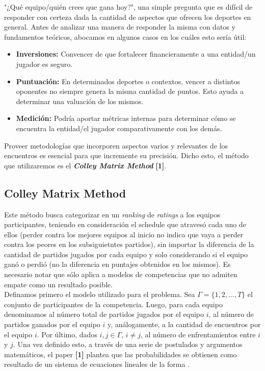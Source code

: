 "¿Qu\'e equipo/qui\'en crees que gana hoy?", una simple pregunta que es dif\'icil de responder con certeza dada la cantidad de aspectos que ofrecen los deportes en general. Antes de analizar una manera de responder la misma con datos y fundamentos te\'oricos, abocamos en algunos casos en los cuáles esto ser\'ia \'util:

\begin{itemize}
\item \textbf{Inversiones:} Convencer de que fortalecer financieramente a una entidad/un jugador es seguro.
\item \textbf{Puntuaci\'on:} En determinados deportes o contextos, vencer a distintos oponentes no siempre genera la misma cantidad de puntos. Esto ayuda a determinar una valuaci\'on de los mismos.
\item \textbf{Medici\'on:} Podr\'ia aportar m\'etricas internas para determinar c\'omo se encuentra la entidad/el jugador comparativamente con los dem\'as.
\end{itemize}

Proveer metodolog\'ias que incorporen aspectos varios y relevantes de los encuentros es esencial para que incremente su precisión. Dicho esto, el m\'etodo que utilizaremos es el \textbf{\textit{Colley Matrix Method}} \textbf{[1]}.

\subsection{Colley Matrix Method}

Este m\'etodo busca categorizar en un \textit{ranking} de \textit{ratings} a los equipos participantes, teniendo en consideraci\'on el schedule que atraves\'o cada uno de ellos (perder contra los mejores equipos al inicio no indica que vaya a perder contra los peores en los subsiguietntes partidos), sin importar la diferencia de la cantidad de partidos jugados por cada equipo y solo considerando si el equipo gan\'o o perdi\'o (no la diferencia en puntajes obtenidos en los mismos). Es necesario notar que s\'olo aplica a modelos de competencias que no admiten empate como un resultado posible. \\

Definamos primero el modelo utilizado para el problema. Sea $\Gamma = \{1,2,...,T\}$ el conjunto de participantes de la competencia. Luego, para cada equipo  denominamos  al n\'umero total de partidos jugados por el equipo $i$,  al n\'umero de partidos ganados por el equipo $i$ y, an\'alogamente,  a la cantidad de encuentros por el equipo $i$. Por \'ultimo, dados $i, j \in \Gamma$, $i \neq j$,  al n\'umero de enfrentamientos entre $i$ y $j$. Una vez definido esto, a través de una serie de postulados y argumentos matemáticos, el paper \textbf{[1]} plantea que las probabilidades se obtienen como resultado de un sistema de ecuaciones lineales de la forma . \\

